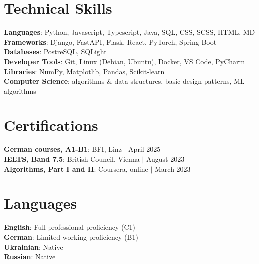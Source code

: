 \documentclass[letterpaper,11pt]{article}
\begin{document}
%
\section{Technical Skills}
 \begin{itemize}[leftmargin=0.15in, label={}]
    \small{\item{
     \textbf{Languages}{: Python, Javascript, Typescript, Java, SQL, CSS, SCSS, HTML, MD} \\
     \textbf{Frameworks}{: Django, FastAPI, Flask, React, PyTorch, Spring Boot} \\
     \textbf{Databases}{: PostreSQL, SQLight} \\
     \textbf{Developer Tools}{: Git, Linux (Debian, Ubuntu), Docker, VS Code, PyCharm} \\
     \textbf{Libraries}{: NumPy, Matplotlib, Pandas, Scikit-learn} \\ \textbf{Computer Science}{: algorithms \& data structures, basic design patterns, ML algorithms} }}
 \end{itemize}



\section{Certifications}
 \begin{itemize}[leftmargin=0.15in, label={}]
    \small{\item{
     \textbf{German courses, A1-B1}{: BFI, Linz $|$ April 2025} \\
     \textbf{IELTS, Band 7.5}{: British Council, Vienna $|$ August 2023} \\
     \textbf{Algorithms, Part I and II}{: Coursera, online $|$ March 2023}
    }}
 \end{itemize}


\section{Languages}
 \begin{itemize}[leftmargin=0.15in, label={}]
    \small{\item{
     \textbf{English}{: Full professional proficiency (C1)} \\
     \textbf{German}{: Limited working proficiency (B1)} \\
     \textbf{Ukrainian}{: Native} \\
     \textbf{Russian}{: Native}
    }}
 \end{itemize}


\end{document}
